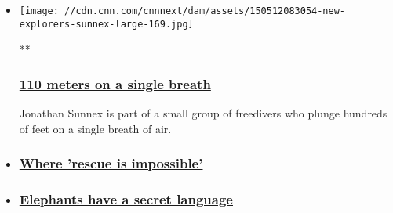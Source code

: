 \begin{itemize}
\item
  \href{/videos/tv/2015/05/13/new-explorers-freediver-jonathan-sunnex-bahamas-deans-blue-hole-orig-cfb.cnn}{}

  \texttt{[image: //cdn.cnn.com/cnnnext/dam/assets/150512083054-new-explorers-sunnex-large-169.jpg]}

  **

  \hypertarget{110-meters-on-a-single-breath}{%
  \subsubsection{\texorpdfstring{\href{/videos/tv/2015/05/13/new-explorers-freediver-jonathan-sunnex-bahamas-deans-blue-hole-orig-cfb.cnn}{110
  meters on a single
  breath}}{110 meters on a single breath}}\label{110-meters-on-a-single-breath}}

  Jonathan Sunnex is part of a small group of freedivers who plunge
  hundreds of feet on a single breath of air.
\item
  \hypertarget{where-rescue-is-impossible}{%
  \subsubsection{\texorpdfstring{\href{/videos/tv/2015/05/27/new-explorers-mike-libecki-first-ascent-marquesas-utah-greenland.cnn}{Where
  'rescue is
  impossible'}}{Where 'rescue is impossible'}}\label{where-rescue-is-impossible}}
\item
  \hypertarget{elephants-have-a-secret-language}{%
  \subsubsection{\texorpdfstring{\href{/videos/tv/2015/05/13/new-explorers-elephants-caitlin-oconnell-namibia-orig-cfb.cnn}{Elephants
  have a secret
  language}}{Elephants have a secret language}}\label{elephants-have-a-secret-language}}
\end{itemize}

